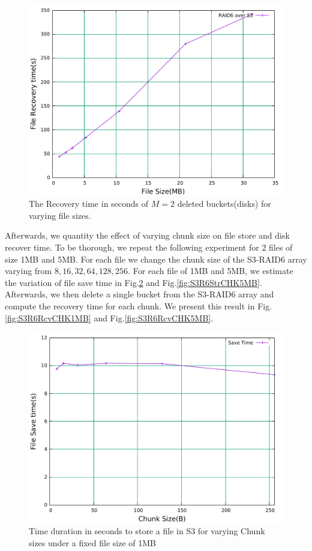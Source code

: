 \begin{figure}[h!]
\includegraphics[width=\linewidth]{figures/S3RAIDRecoveryTime.pdf}
\centering
\caption{The Recovery time in seconds of $M=2$ deleted buckets(disks) for varying file sizes.}
\label{fig:S3R6Rcv}
\end{figure}

Afterwards, we quantity the effect of varying chunk size on file store and disk recover time.
To be thorough, we repeat the following experiment for 2 files of size 1MB and 5MB.
For each file we change the chunk size of the S3-RAID6 array varying from $8, 16, 32, 64, 128, 256$. For each file of 1MB and 5MB, we estimate the variation of file save time in Fig.\ref{fig:S3R6StrCHK1MB} and Fig.\ref{fig:S3R6StrCHK5MB}.
Afterwards, we then delete a single bucket from the S3-RAID6 array and compute the recovery time for each chunk.
We present this result in Fig.\ref{fig:S3R6RcvCHK1MB} and Fig.\ref{fig:S3R6RcvCHK5MB}. 

\begin{figure}[h]
\centering
\includegraphics[width=\linewidth]{figures/RAIDStoreTimeChuckSize1Mb.pdf}
\caption{Time duration in seconds to store a file in S3 for varying Chunk sizes under a fixed file size of 1MB}
\label{fig:S3R6StrCHK1MB}
\end{figure}

